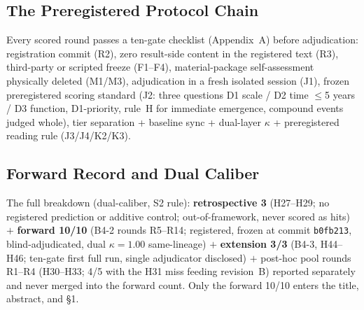 
\subsection{The Preregistered Protocol Chain}\label{sec:val-chain}

Every scored round passes a ten-gate checklist (Appendix~A) before
adjudication: registration commit (R2), zero result-side content in
the registered text (R3), third-party or scripted freeze (F1--F4),
material-package self-assessment physically deleted (M1/M3),
adjudication in a fresh isolated session (J1), frozen preregistered
scoring standard (J2: three questions D1 scale / D2 time $\le$5
years / D3 function, D1-priority, rule~H for immediate emergence,
compound events judged whole), tier separation + baseline sync +
dual-layer $\kappa$ + preregistered reading rule (J3/J4/K2/K3).

\subsection{Forward Record and Dual Caliber}\label{sec:val-record}

The full breakdown (dual-caliber, S2 rule): \textbf{retrospective 3}
(H27--H29; no registered prediction or additive control;
out-of-framework, never scored as hits) $+$ \textbf{forward 10/10}
(B4-2 rounds R5--R14; registered, frozen at commit \texttt{b0fb213},
blind-adjudicated, dual $\kappa=1.00$ same-lineage) $+$
\textbf{extension 3/3} (B4-3, H44--H46; ten-gate first full run,
single adjudicator disclosed) $+$ post-hoc pool rounds R1--R4
(H30--H33; 4/5 with the H31 miss feeding revision~B) reported
separately and never merged into the forward count. Only the forward
10/10 enters the title, abstract, and §1.

